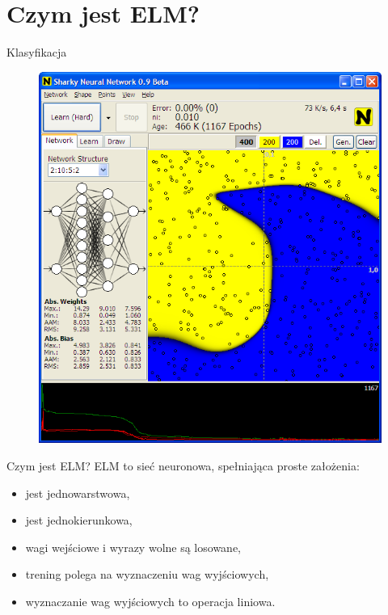 \documentclass{beamer}
\begin{document}
\section{Czym jest ELM?}
\begin{frame}{Klasyfikacja}
\begin{figure}
	\includegraphics[scale=0.3]{klasyfikacja.png}
\end{figure}
\end{frame}
\begin{frame}{Czym jest ELM?}
ELM to sieć neuronowa, spełniająca proste założenia:
\begin{itemize}
\item jest jednowarstwowa,
\item jest jednokierunkowa,
\item wagi wejściowe i wyrazy wolne są losowane,
\item trening polega na wyznaczeniu wag wyjściowych,
\item wyznaczanie wag wyjściowych to operacja liniowa.
\end{itemize}
\end{frame}
\end{document}
